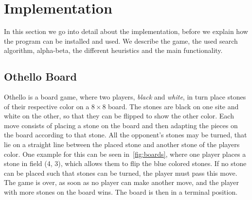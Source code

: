 \section{Implementation}
\label{sec:implementation}
In this section we go into detail about the implementation, before we explain how the program can be installed and used.
We describe the game, the used search algorithm, alpha-beta, the different heuristics and the main functionality.

\subsection{Othello Board}
Othello is a board game, where two players, \textit{black} and \textit{white}, in turn place stones of their respective color on a $8\times 8$ board.
The stones are black on one site and white on the other, so that they can be flipped to show the other color.
Each move consists of placing a stone on the board and then adapting the pieces on the board according to that stone.
All the opponent's stones may be turned, that lie on a straight line between the placed stone and another stone of the players color.
One example for this can be seen in~\cref{fig:boards}, where one player places a stone in field (4, 3), which allows them to flip the blue colored stones.
If no stone can be placed such that stones can be turned, the player must pass this move.
The game is over, as soon as no player can make another move, and the player with more stones on the board wins.
The board is then in a terminal position.

